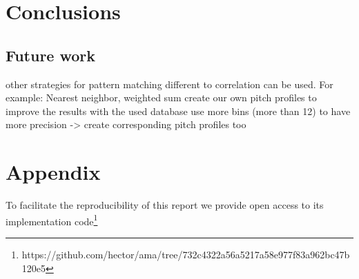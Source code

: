\documentclass{article}
\begin{document}
\section{Conclusions} %

%
%
%

\subsection{Future work}
other strategies for pattern matching different to correlation can be used. For example: Nearest neighbor, weighted sum
create our own pitch profiles to improve the results with the used database
use more bins (more than 12) to have more precision -> create corresponding pitch profiles too

\section{Appendix}

To facilitate the reproducibility of this report we provide open access to its implementation code\footnote{https://github.com/hector/ama/tree/732c4322a56a5217a58e977f83a962bc47b120e5} %
\end{document}
